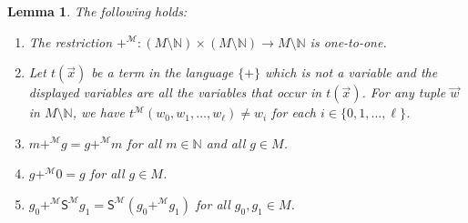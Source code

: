 \documentclass[10pt,a4paper, openany,  oldfontcommands]{memoir}
\newtheorem{lemma} [theorem] {Lemma}
\newtheorem{open problem} [theorem] {Open Problem}
\newtheorem{open question} [theorem] {Open Question}
\renewcommand{\mathrm}{\mathsf}
\begin{document}
\begin{lemma}
The following holds:
\begin{enumerate}
\item The restriction   $ +^{  \mathcal{M}  }  :     \left( M  \setminus  \mathbb{N} \right)  \times    \left( M  \setminus  \mathbb{N} \right)   \to    M  \setminus  \mathbb{N} $
is  one-to-one. 

\item   Let   $ t ( \vec{x} ) $ be a term   in the language  $  \lbrace + \rbrace $  which is not a variable and  the displayed variables are all the variables that occur in     $ t ( \vec{x} ) $. 
For any tuple  $    \vec{w}  $ in $  M  \setminus  \mathbb{N} $,   we have 
$ t^{  \mathcal{M}  } ( w_0, w_1,  \ldots , w_{ \ell } )   \neq  w_i $  for each  $ i  \in  \lbrace 0, 1,  \ldots ,  \ell  \rbrace $. 


\item   $  m  +^{  \mathcal{M}  }  g  =  g   +^{  \mathcal{M}  }   m  $   for  all   $  m \in  \mathbb{N} $  and  all   $ g  \in M $. 


\item  $  g +^{  \mathcal{M}  }   0  =  g  $  for all $  g \in  M  $. 

\item   $ g_0   +^{  \mathcal{M}  }    \mathrm{S}^{ \mathcal{M}  }  g_1  =   \mathrm{S}^{ \mathcal{M}  }   \left(    g_0   +^{  \mathcal{M}  }    g_1  \right)  $ 
for all $  g_0, g_1  \in M $.
\end{enumerate}
\end{lemma}
\end{document}
